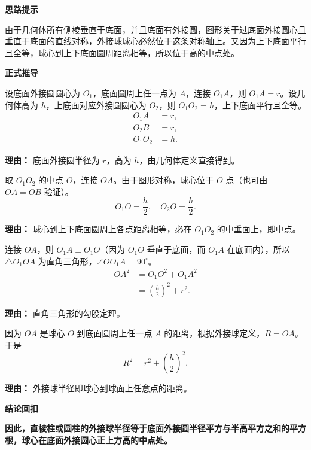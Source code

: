 \begin{proofbox}
	\textbf{\textcolor{CProof}{思路提示}}

	由于几何体所有侧棱垂直于底面，并且底面有外接圆，图形关于过底面外接圆心且垂直于底面的直线对称，外接球球心必然位于这条对称轴上。又因为上下底面平行且全等，球心到上下底面圆周距离相等，所以位于高的中点处。

	\medskip
	\textbf{\textcolor{CProof}{正式推导}}
	\begin{description}[style=nextline, leftmargin=2.8em, labelsep=0.5em, itemsep=0.55em]
		\item[\textbf{步骤一（设出基本量）：}] 设底面外接圆圆心为 $O_1$，底面圆周上任一点为 $A$，连接 $O_1A$，则 $O_1A = r$。设几何体高为 $h$，上底面对应外接圆圆心为 $O_2$，则 $O_1O_2 = h$，上下底面平行且全等。
			\[
				\begin{aligned}
					O_1A &= r, \\
					O_2B &= r, \\
					O_1O_2 &= h.
			\end{aligned}
			\]
			\par\textbf{理由：} 底面外接圆半径为 $r$，高为 $h$，由几何体定义直接得到。

		\item[\textbf{步骤二（确定球心位置）：}] 取 $O_1O_2$ 的中点 $O$，连接 $OA$。由于图形对称，球心位于 $O$ 点（也可由 $OA = OB$ 验证）。
			\[
				O_1O = \frac{h}{2}, \quad O_2O = \frac{h}{2}.
			\]
			\par\textbf{理由：} 球心到上下底面圆周上各点距离相等，必在 $O_1O_2$ 的中垂面上，即中点。

		\item[\textbf{步骤三（构造直角三角形）：}] 连接 $OA$，则 $O_1A \perp O_1O$（因为 $O_1O$ 垂直于底面，而 $O_1A$ 在底面内），所以 $\triangle O_1OA$ 为直角三角形，$\angle OO_1A = 90^\circ$。
			\[
				\begin{aligned}
					OA^2 &= O_1O^2 + O_1A^2 \\
					&= \left(\frac{h}{2}\right)^2 + r^2.
			\end{aligned}
			\]
			\par\textbf{理由：} 直角三角形的勾股定理。

		\item[\textbf{步骤四（得到外接球半径）：}] 因为 $OA$ 是球心 $O$ 到底面圆周上任一点 $A$ 的距离，根据外接球定义，$R = OA$。于是
			\[
				R^2 = r^2 + \left(\frac{h}{2}\right)^2.
			\]
			\par\textbf{理由：} 外接球半径即球心到球面上任意点的距离。
	\end{description}

	\medskip
	\textbf{\textcolor{CProof}{结论回扣}}

	\textbf{因此，直棱柱或圆柱的外接球半径等于底面外接圆半径平方与半高平方之和的平方根，球心在底面外接圆心正上方高的中点处。}
\end{proofbox}
